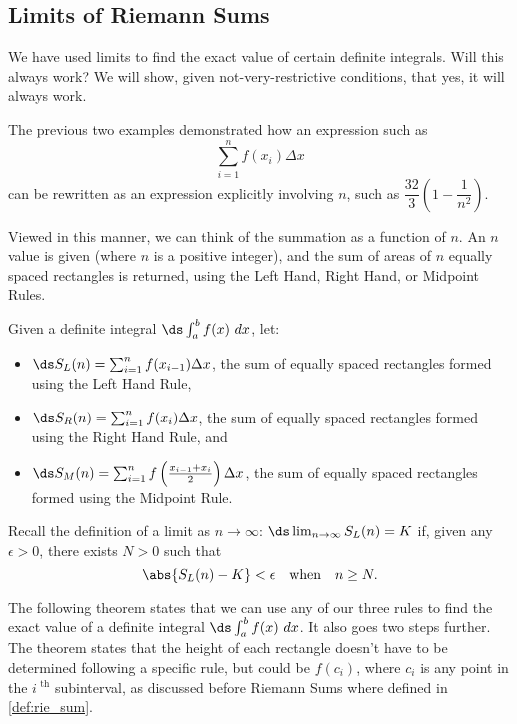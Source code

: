 \subsection{Limits of Riemann Sums}

We have used limits to find the exact value of certain definite integrals. Will this always work? We will show, given not-very-restrictive conditions, that yes, it will always work.

The previous two examples demonstrated how an expression such as
\[\sum_{i=1}^n f(x_i)\Delta x\]
can be rewritten as an expression explicitly involving $n$, such as $\dfrac{32}3(1-\dfrac1{n^2})$.

Viewed in this manner, we can think of the summation as a function of $n$. An $n$ value is given (where $n$ is a positive integer), and the sum of areas of $n$ equally spaced rectangles is returned, using the Left Hand, Right Hand, or Midpoint Rules. 

Given a definite integral $\ds\int_a^b f(x)\ dx$, let:
\begin{itemize}
	\item	$\ds S_L(n) = \sum_{i=1}^n f(x_{i-1})\Delta x$, the sum of equally spaced rectangles formed using the Left Hand Rule,
	\item	$\ds S_R(n) = \sum_{i=1}^n f(x_i)\Delta x$, the sum of equally spaced rectangles formed using the Right Hand Rule, and
	\item	$\ds S_M(n) = \sum_{i=1}^n f\left(\frac{x_{i-1}+x_i}{2}\right)\Delta x$, the sum of equally spaced rectangles formed using the Midpoint Rule.
\end{itemize}
	
Recall the definition of a limit as $n\to\infty$: $\ds\lim_{n\to\infty}S_L(n) = K$ if, given any $\epsilon>0$, there exists $N>0$ such that
\[\abs{S_L(n)-K}< \epsilon \quad \text{when}\quad n\geq N.\]

The following theorem states that we can use any of our three rules to find the exact value of a definite integral $\ds\int_a^b f(x)\ dx$. It also goes two steps further. The theorem states that the height of each rectangle doesn't have to be determined following a specific rule, but could be $f(c_i)$, where $c_i$ is any point in the $i^\text{ th}$ subinterval, as discussed before Riemann Sums where defined in \autoref{def:rie_sum}.

